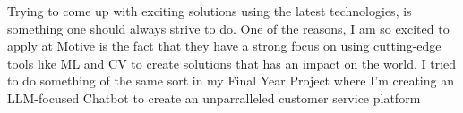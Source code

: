 



Trying to come up with exciting solutions using the latest technologies, is something one should always strive to do. One of the reasons, I am so excited to apply at Motive is the fact that they have a strong focus on using cutting-edge tools like ML and CV to create solutions that has an impact on the world. I tried to do something of the same sort in my Final Year Project where I'm creating an LLM-focused Chatbot to create an unparralleled customer service platform